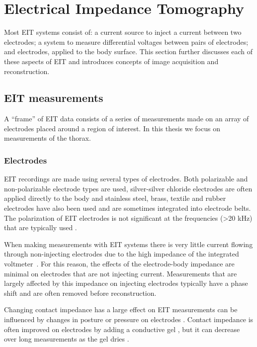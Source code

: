 \section{Electrical Impedance Tomography}

Most EIT systems consist of: 
a current source to inject a current between two electrodes;
a system to measure differential voltages between pairs of electrodes; and
electrodes, applied to the body surface.
This section further discusses each of these aspects of EIT 
and introduces concepts of image acquisition and reconstruction.


\subsection{EIT measurements}
A ``frame'' of EIT data consists of a series of measurements made on an array
of electrodes placed around
a region of interest. In this thesis we focus on measurements of the thorax. 

\subsubsection{Electrodes} \label{sec:electrodes}

EIT recordings are made using several types of electrodes. 
Both polarizable and non-polarizable
electrode types are used,
silver-silver chloride electrodes are often applied directly to the body
and stainless steel, brass, textile and rubber electrodes have also 
been used \parencite{adler_electrical_2017} and are sometimes 
integrated into electrode belts. The polarization of EIT electrodes is 
not significant at the frequencies (>20 kHz) that are typically used
\parencite{adler_electrical_2017}.

When making measurements with EIT systems there is very little current flowing
through non-injecting electrodes due to the high impedance of the 
integrated voltmeter~\parencite{holder_electrical_2004}.
For this reason, the effects of the electrode-body impedance 
are minimal on electrodes that are not injecting current. Measurements that 
are largely affected by this impedance on injecting electrodes typically have a
phase shift and are often removed before reconstruction. 

Changing contact impedance has a large effect on EIT measurements 
can be influenced by changes in posture or pressure on electrodes 
\parencite{coulombe_parametric_2005}.
Contact impedance is often improved on electrodes by adding a
conductive gel \parencite{waldmann_performance_2017}, but it can decrease 
over long measurements as the gel dries \parencite{lozano_errors_1995}. 

